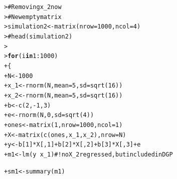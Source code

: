\documentclass[12pt]{article}\usepackage[]{graphicx}\usepackage[]{color}
\makeatletter
\newcommand{\hlnum}[1]{\textcolor[rgb]{0.82,0.78,0.62}{#1}}%
\newcommand{\hlcom}[1]{\textcolor[rgb]{0.404,0.408,0.42}{#1}}%
\newcommand{\hlopt}[1]{\textcolor[rgb]{0.882,0.878,0.898}{#1}}%
\newcommand{\hlstd}[1]{\textcolor[rgb]{0.882,0.878,0.898}{#1}}%
\newcommand{\hlkwa}[1]{\textcolor[rgb]{0.384,0.675,0.808}{\textbf{#1}}}%
\newcommand{\hlkwb}[1]{\textcolor[rgb]{0.902,0.675,0.196}{#1}}%
\newcommand{\hlkwc}[1]{\textcolor[rgb]{0.812,0.522,0.388}{#1}}%
\newcommand{\hlkwd}[1]{\textcolor[rgb]{0.733,0.388,0.812}{#1}}%
\newenvironment{kframe}{%
 \def\at@end@of@kframe{}%
 \ifinner\ifhmode%
  \def\at@end@of@kframe{\end{minipage}}%
  \begin{minipage}{\columnwidth}%
 \fi\fi%
 \def\FrameCommand##1{\hskip\@totalleftmargin \hskip-\fboxsep
 \colorbox{shadecolor}{##1}\hskip-\fboxsep
     \hskip-\linewidth \hskip-\@totalleftmargin \hskip\columnwidth}%
 \MakeFramed {\advance\hsize-\width
   \@totalleftmargin\z@ \linewidth\hsize
   \@setminipage}}%
 {\par\unskip\endMakeFramed%
 \at@end@of@kframe}
\newenvironment{knitrout}{}{} %
\makeatother
\begin{document}
\begin{flushleft}
\begin{knitrout}
\color{fgcolor}\begin{kframe}
\begin{alltt}
\hlstd{> }\hlcom{# Removing x_2 now}
\hlstd{> }\hlcom{#  New empty matrix}
\hlstd{> }\hlstd{simulation2} \hlkwb{<-} \hlkwd{matrix}\hlstd{(}\hlkwc{nrow} \hlstd{=} \hlnum{1000}\hlstd{,} \hlkwc{ncol} \hlstd{=} \hlnum{4}\hlstd{)}
\hlstd{> }\hlcom{# head(simulation2)}
\hlstd{> }
\hlstd{> }\hlkwa{for} \hlstd{(i} \hlkwa{in} \hlnum{1}\hlopt{:}\hlnum{1000}\hlstd{)}
\hlstd{+ }\hlstd{\{}
\hlstd{+ }  \hlstd{N} \hlkwb{<-} \hlnum{1000}
\hlstd{+ }  \hlstd{x_1} \hlkwb{<-} \hlkwd{rnorm}\hlstd{(N,} \hlkwc{mean}\hlstd{=}\hlnum{5}\hlstd{,} \hlkwc{sd}\hlstd{=}\hlkwd{sqrt}\hlstd{(}\hlnum{16}\hlstd{))}
\hlstd{+ }  \hlstd{x_2} \hlkwb{<-} \hlkwd{rnorm}\hlstd{(N,} \hlkwc{mean}\hlstd{=}\hlnum{5}\hlstd{,} \hlkwc{sd}\hlstd{=}\hlkwd{sqrt}\hlstd{(}\hlnum{16}\hlstd{))}
\hlstd{+ }  \hlstd{b} \hlkwb{<-} \hlkwd{c}\hlstd{(}\hlnum{2}\hlstd{,} \hlopt{-}\hlnum{1}\hlstd{,} \hlnum{3}\hlstd{)}
\hlstd{+ }  \hlstd{e} \hlkwb{<-} \hlkwd{rnorm}\hlstd{(N,} \hlnum{0}\hlstd{,} \hlkwc{sd}\hlstd{=}\hlkwd{sqrt}\hlstd{(}\hlnum{4}\hlstd{))}
\hlstd{+ }  \hlstd{ones} \hlkwb{<-} \hlkwd{matrix}\hlstd{(}\hlnum{1}\hlstd{,} \hlkwc{nrow}\hlstd{=}\hlnum{1000}\hlstd{,} \hlkwc{ncol}\hlstd{=}\hlnum{1}\hlstd{)}
\hlstd{+ }  \hlstd{X} \hlkwb{<-} \hlkwd{matrix}\hlstd{(}\hlkwd{c}\hlstd{(ones, x_1, x_2),} \hlkwc{nrow}\hlstd{=N)}
\hlstd{+ }  \hlstd{y} \hlkwb{<-} \hlstd{b[}\hlnum{1}\hlstd{]}\hlopt{*}\hlstd{X[,}\hlnum{1}\hlstd{]}\hlopt{+} \hlstd{b[}\hlnum{2}\hlstd{]}\hlopt{*}\hlstd{X[,}\hlnum{2}\hlstd{]}\hlopt{+} \hlstd{b[}\hlnum{3}\hlstd{]}\hlopt{*}\hlstd{X[,}\hlnum{3}\hlstd{]} \hlopt{+} \hlstd{e}
\hlstd{+ }  \hlstd{m1} \hlkwb{<-} \hlkwd{lm}\hlstd{(y} \hlopt{~} \hlstd{x_1)}                \hlcom{#! no X_2 regressed, but included in DGP}

\hlstd{+ }  \hlstd{sm1} \hlkwb{<-} \hlkwd{summary}\hlstd{(m1)}


\end{alltt}
\end{kframe}
\end{knitrout}
\end{flushleft}
\end{document}
